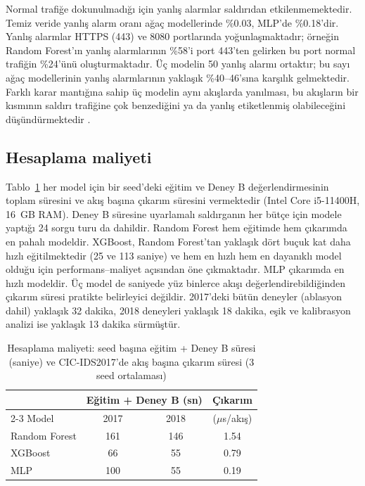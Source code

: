 \documentclass[conference]{IEEEtran}
\begin{document}
Normal trafiğe dokunulmadığı için yanlış alarmlar saldırıdan etkilenmemektedir. Temiz veride yanlış alarm oranı ağaç modellerinde \%0.03, MLP'de \%0.18'dir. Yanlış alarmlar HTTPS (443) ve 8080 portlarında yoğunlaşmaktadır; örneğin Random Forest'ın yanlış alarmlarının \%58'i port 443'ten gelirken bu port normal trafiğin \%24'ünü oluşturmaktadır. Üç modelin 50 yanlış alarmı ortaktır; bu sayı ağaç modellerinin yanlış alarmlarının yaklaşık \%40--46'sına karşılık gelmektedir. Farklı karar mantığına sahip üç modelin aynı akışlarda yanılması, bu akışların bir kısmının saldırı trafiğine çok benzediğini ya da yanlış etiketlenmiş olabileceğini düşündürmektedir \cite{engelen2021}.

\subsection{Hesaplama maliyeti}
Tablo~\ref{tab:cost} her model için bir seed'deki eğitim ve Deney B değerlendirmesinin toplam süresini ve akış başına çıkarım süresini vermektedir (Intel Core i5-11400H, 16~GB RAM). Deney B süresine uyarlamalı saldırganın her bütçe için modele yaptığı 24 sorgu turu da dahildir. Random Forest hem eğitimde hem çıkarımda en pahalı modeldir. XGBoost, Random Forest'tan yaklaşık dört buçuk kat daha hızlı eğitilmektedir (25 ve 113 saniye) ve hem en hızlı hem en dayanıklı model olduğu için performans--maliyet açısından öne çıkmaktadır. MLP çıkarımda en hızlı modeldir. Üç model de saniyede yüz binlerce akışı değerlendirebildiğinden çıkarım süresi pratikte belirleyici değildir. 2017'deki bütün deneyler (ablasyon dahil) yaklaşık 32 dakika, 2018 deneyleri yaklaşık 18 dakika, eşik ve kalibrasyon analizi ise yaklaşık 13 dakika sürmüştür.

\begin{table}[t]
\caption{Hesaplama maliyeti: seed başına eğitim + Deney B süresi (saniye) ve CIC-IDS2017'de akış başına çıkarım süresi (3 seed ortalaması)}
\label{tab:cost}
\centering
\begin{tabular}{lccc}
\toprule
 & \multicolumn{2}{c}{Eğitim + Deney B (sn)} & Çıkarım \\
\cmidrule(lr){2-3}
Model & 2017 & 2018 & ($\mu$s/akış) \\
\midrule
Random Forest & 161 & 146 & 1.54 \\
XGBoost & 66 & 55 & 0.79 \\
MLP & 100 & 55 & 0.19 \\
\bottomrule
\end{tabular}
\end{table}
\end{document}
